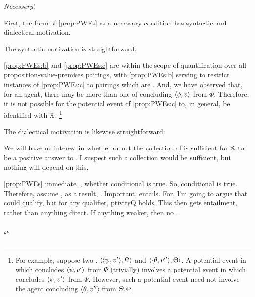 \begin{note}
  \emph{Necessary}!

  First, the form of \autoref{prop:PWEs} as a necessary condition has syntactic and dialectical motivation.

  The syntactic motivation is straightforward:
  \begin{shiftpar}
    \ref{prop:PWEs:b} and \ref{prop:PWEs:c} are within the scope of quantification over all proposition-value-premises pairings, with \ref{prop:PWEs:b} serving to restrict instances of \ref{prop:PWEs:c} to pairings which are \requ{}.
    And, we have observed that, for an agent, there may be more than one \requ{} of concluding \(\pv{\phi}{v}\) from \(\Phi\).
    Therefore, it is not possible for the potential event of \ref{prop:PWEs:c} to, in general, be identified with \(\qzSaV{}\).%
    \footnote{
      For example, suppose two .
      \(\pvp{\psi}{v'}{\Psi}\) and \(\pvp{\theta}{v''}{\Theta}\).
      A potential event in which \vAgent{} concludes \(\pv{\psi}{v'}\) from \(\Psi\) (trivially) involves a potential event in which \vAgent{} concludes \(\pv{\psi}{v'}\) from \(\Psi\).
      However, such a potential event need not involve the agent concluding \(\pv{\theta}{v''}\) from \(\Theta\).
    }
  \end{shiftpar}

  The dialectical motivation is likewise straightforward:

  \begin{shiftpar}
    We will have no interest in whether or not the collection of  is sufficient for \(\qzSaV{}\) to be a positive answer to \qzS{}.
    I suspect such a collection would be sufficient, but nothing will depend on this.
  \end{shiftpar}
\end{note}

\begin{note}
  \autoref{prop:PWEs} immediate.
  \qzS{}, whether conditional is true.
  So, conditional is true.
  Therefore, assume \requ{}, as a result, \fc{}.
  {
    \color{red}
    Important, entails.
    For, I'm going to argue that could qualify, but for any qualifier, ptivityQ holds.
    This then gets entailment, rather than anything direct.
  }
  If anything weaker, then no \fc{}.
\end{note}

\subsubsection{`'}
\label{cha:zSpA:sec:the-argument}

